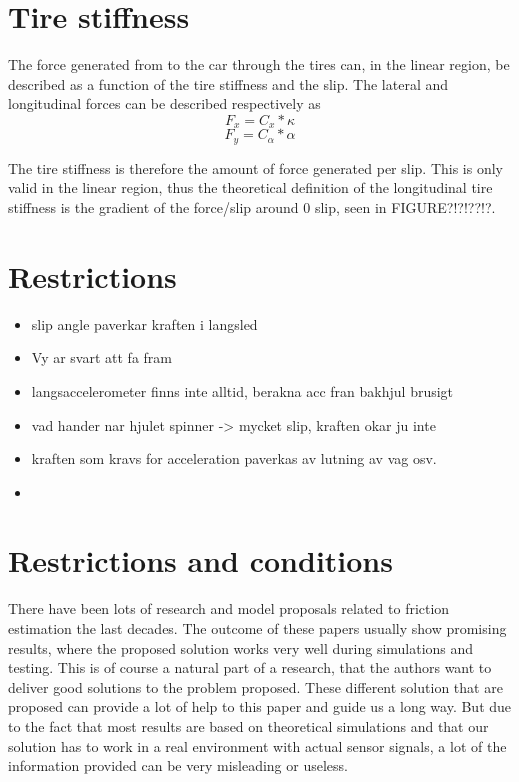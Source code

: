 \section{Tire stiffness}

The force generated from to the car through the tires can, in the linear region, be described as a function of the tire stiffness and the slip. The lateral and longitudinal forces can be described respectively as
\begin{equation}
	F_{x} = C_{x}*\kappa
\end{equation}
\begin{equation}
	F_{y} = C_{\alpha}*\alpha
\end{equation}

The tire stiffness is therefore the amount of force generated per slip. This is only valid in the linear region, thus the theoretical definition of the longitudinal tire stiffness is the gradient of the force/slip around 0 slip, seen in FIGURE?!?!??!?. 
\section{Restrictions}

\begin{itemize}
	\item slip angle paverkar kraften i langsled
	\item Vy ar svart att fa fram
	\item langsaccelerometer finns inte alltid, berakna acc fran bakhjul brusigt
	\item vad hander nar hjulet spinner -> mycket slip, kraften okar ju inte
	\item kraften som kravs for acceleration paverkas av lutning av vag osv.
	\item 
\end{itemize}

\section{Restrictions and conditions}
There have been lots of research and model proposals related to friction estimation the last decades. The outcome of these papers usually show promising results, where the proposed solution works very well during simulations and testing. This is of course a natural part of a research, that the authors want to deliver good solutions to the problem proposed. These different solution that are proposed can provide a lot of help to this paper and guide us a long way. But due to the fact that most results are based on theoretical simulations and that our solution has to work in a real environment with actual sensor signals, a lot of the information provided can be very misleading or useless. 

